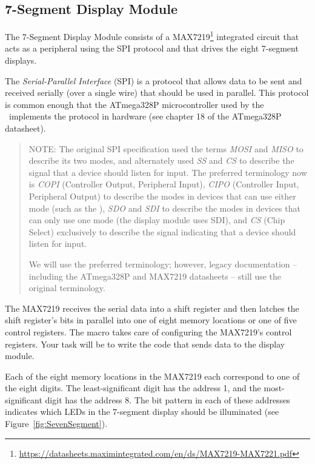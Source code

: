 \subsection{7-Segment Display Module}

The 7-Segment Display Module consists of a
MAX7219\footnote{\url{https://datasheets.maximintegrated.com/en/ds/MAX7219-MAX7221.pdf}}
integrated circuit that acts as a peripheral using the SPI protocol and that
drives the eight 7-segment displays.

The \textit{Serial-Parallel Interface} (SPI) is a protocol that allows data to
be sent and received serially (over a single wire) that should be used in
parallel. This protocol is common enough that the ATmega328P microcontroller
used by the \nano\ implements the protocol in hardware (see chapter 18 of the
ATmega328P datasheet).

    \begin{quote}
    NOTE: The original SPI specification used the terms \textit{MOSI} and
    \textit{MISO} to describe its two modes, and alternately used \textit{SS}
    and \textit{CS} to describe the signal that a device should listen for
    input. The preferred terminology now is \textit{COPI} (Controller Output,
    Peripheral Input), \textit{CIPO} (Controller Input, Peripheral Output) to
    describe the modes in devices that can use either mode (such as the \nano),
    \textit{SDO} and \textit{SDI} to describe the modes in devices that can
    only use one mode (the display module uses SDI), and \textit{CS} (Chip
    Select) exclusively to describe the signal indicating that a device should
    listen for input.

    We will use the preferred terminology; however, legacy documentation --
    including the ATmega328P and MAX7219 datasheets -- still use the original
    terminology.
    \end{quote}

The MAX7219 receives the serial data into a shift register and then latches the
shift register's bits in parallel into one of eight memory locations or one of
five control registers. The  macro takes care of
configuring the MAX7219's control registers. Your task will be to write the
code that sends data to the display module.

Each of the eight memory locations in the MAX7219 each correspond to one of the
eight digits. The least-significant digit has the address 1, and the most-
significant digit has the address 8. The bit pattern in each of these addresses
indicates which LEDs in the 7-segment display should be illuminated (see
Figure~\ref{fig:SevenSegment}).

